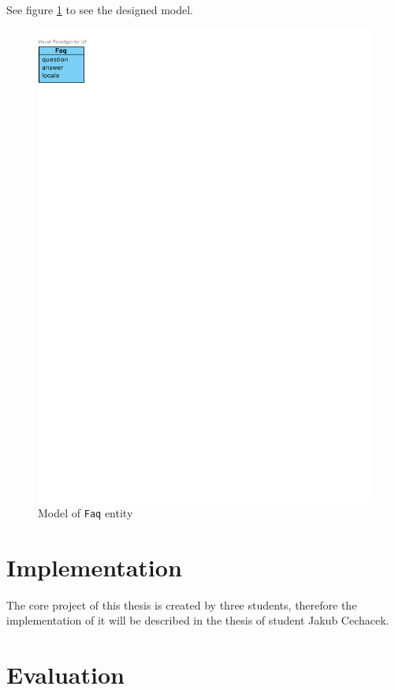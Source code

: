 See figure \ref{fig:domain-faq-entity} to see the designed model.

\begin{figure}[h]
    \centering
        \includegraphics[trim=0 740 510 30, clip, keepaspectratio]{./images/domain-faq-entity.pdf}
    \caption{Model of \texttt{Faq} entity}
    \label{fig:domain-faq-entity}
\end{figure}

\section{Implementation}

The core project of this thesis is created by three students, therefore the implementation of it will be described in the thesis of student Jakub Cechacek.

\section{Evaluation}

